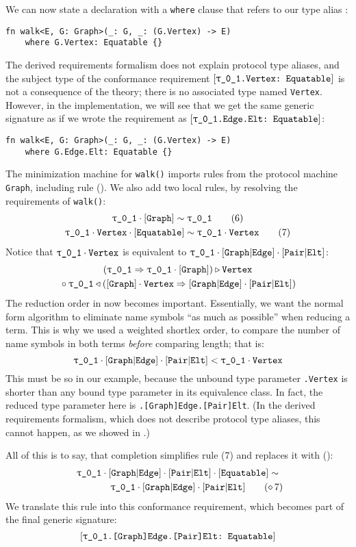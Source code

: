 \documentclass[../generics]{subfiles}
\begin{document}
\begin{example}
We can now state a declaration with a \texttt{where} clause that refers to our type alias \nV:
\begin{Verbatim}
fn walk<E, G: Graph>(_: G, _: (G.Vertex) -> E)
    where G.Vertex: Equatable {}
\end{Verbatim}
The derived requirements formalism does not explain protocol type aliases, and the subject type of the conformance requirement $\ConfReq{\rU.Vertex}{Equatable}$ is not a consequence of the theory; there is no associated type named \texttt{Vertex}. However, in the implementation, we will see that we get the same generic signature as if we wrote the requirement as $\ConfReq{\rU.Edge.Elt}{Equatable}$:
\begin{Verbatim}
fn walk<E, G: Graph>(_: G, _: (G.Vertex) -> E)
    where G.Edge.Elt: Equatable {}
\end{Verbatim}

The minimization machine for \texttt{walk()} imports rules from the protocol machine \texttt{Graph}, including rule (). We also add two local rules, by resolving the requirements of \texttt{walk()}:
\begin{gather*}
\ConfRule{\rU}{\pGraph}\tag{6}\\
\ConfRule{\rU\cdot\nV}{\pEquatable}\tag{7}
\end{gather*}
Notice that $\rU\cdot\nV$ is equivalent to $\rU\cdot\aEd\cdot\aEl$:
\begin{gather*}
(\rU \Rightarrow \rU\cdot\pGraph) \WR \nV \\
{} \circ \rU \WL (\pGraph \cdot \nV \Rightarrow \aEd\cdot\aEl)
\end{gather*}
The reduction order in  now becomes important. Essentially, we want the normal form algorithm to eliminate name symbols ``as much as possible'' when reducing a term. This is why we used a weighted shortlex order, to compare the number of name symbols in both terms \emph{before} comparing length; that is:
\[\rU\cdot\aEd\cdot\aEl < \rU\cdot\nV\]
This must be so in our example, because the unbound type parameter \texttt{\rU.Vertex} is shorter than any bound type parameter in its equivalence class. In fact, the reduced type parameter here is \texttt{\rU.[Graph]Edge.[Pair]Elt}. (In the derived requirements formalism, which does not describe protocol type aliases, this cannot happen, as we showed in .)

All of this is to say, that completion simplifies rule (7) and replaces it with ():
\begin{gather*}
\rU\cdot\aEd\cdot\aEl\cdot\pEquatable \sim\\
\qquad\qquad \rU\cdot\aEd\cdot\aEl
\tag{\CRule{7}}
\end{gather*}
We translate this rule into this conformance requirement, which becomes part of the final generic signature:
\[\ConfReq{\rU.[Graph]Edge.[Pair]Elt}{Equatable}\]
\end{example}
\end{document}
